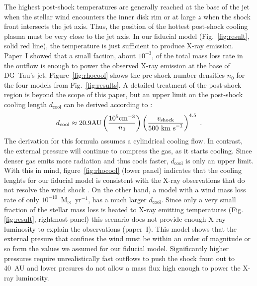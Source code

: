 The highest post-shock temperatures are generally reached at the base of the jet when the stellar wind encounters the inner disk rim or at large $z$ when the shock front intersects the jet axis. Thus, the position of the hottest post-shock cooling plasma must be very close to the jet axis. In our fiducial model (Fig.~\ref{fig:result}, solid red line), the temperature is just sufficient to produce X-ray emission. Paper~I showed that a small faction, about $10^{-3}$, of the total mass loss rate in the outflow is enough to power the observed X-ray emission at the base of DG~Tau's jet. Figure~\ref{fig:rhocool} shows the pre-shock number densities $n_0$ for the four models from Fig.~\ref{fig:results}. A detailed treatment of the post-shock region is beyond the scope of this paper, but an upper limit on the post-shock cooling length $d_{\mathrm{cool}}$ can be derived according to \citet{http://adsabs.harvard.edu/abs/2002ApJ...576L.149R}:
\begin{equation}
d_{\mathrm{cool}} \approx 20.9 \mathrm{ AU}
    \left(\frac{10^5\mathrm{ cm}^{-3}}{n_0}\right)
    \left(\frac{v_{\mathrm{shock}}}{500\textnormal{ km s}^{-1}}\right)^{4.5}\ .
\end{equation}
The derivation for this formula assumes a cylindrical cooling flow. In contrast, the external pressure will continue to compress the gas, as it starts cooling. Since denser gas emits more radiation and thus cools faster, $d_{\mathrm{cool}}$ is only an upper limit. With this in mind, figure~\ref{fig:rhocool} (lower panel) indicates that the cooling lenghts for our fiducial model is consistent with the X-ray observations that do not resolve the wind shock \citep{2008A&A...488L..13S}. On the other hand, a model with a wind mass loss rate of only $10^{-10}$~M$_{\odot}$~yr$^{-1}$, has a much larger $d_{\mathrm{cool}}$. Since only a very small fraction of the stellar mass loss is heated to X-ray emitting temperatures (Fig.\ref{fig:result}, rightmost panel) this scenario does not provide enough X-ray luminosity to explain the observations (paper~I). This model shows that the external presure that confines the wind must be within an order of magnitude or so form the values we assumed for our fiducial model. Significantly higher pressures require unrealistically fast outflows to push the shock front out to 40~AU and lower presures do not allow a mass flux high enough to power the X-ray luminosity.

